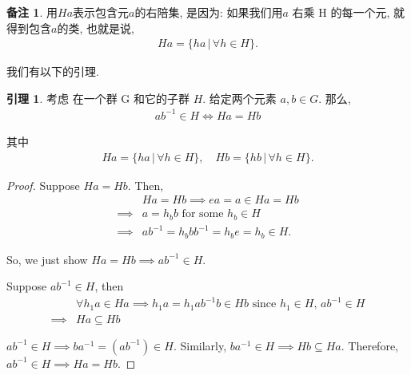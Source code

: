 \documentclass[utf8]{ctexbook}
\theoremstyle{definition}
\newtheorem{memo}{备注}[section]
\newtheorem{lemma}{引理}[section]
\begin{document}
\begin{memo}
用$Ha$表示包含元$a$的右陪集, 是因为: 如果我们用$a$ 右乘 H 的每一个元, 就得到包含$a$的类, 也就是说, 
\begin{align*}
Ha= \{ ha \, | \, \forall h \in H \} .
\end{align*}

我们有以下的引理.

\end{memo}

\begin{lemma}\label{lemma_right_coset_def_equivalence}
考虑 在一个群 G 和它的子群 $H$. 给定两个元素 $a, b \in G$. 那么,
\begin{align*}
 ab^{-1} \in H \iff Ha = Hb 
\end{align*}

其中
\begin{align*}
Ha= \{ ha \, | \, \forall h \in H \} , \quad Hb= \{ hb \, | \, \forall h \in H \} .
\end{align*}

\end{lemma}

\begin{proof}
Suppose $Ha = Hb$. Then,
\begin{align*}
& Ha = Hb \implies ea = a \in Ha = Hb \\
\implies & a = h_b b \mbox{ for some } h_b \in H \\
\implies & a b^{-1} = h_b b b^{-1} = h_b e = h_b \in H .
\end{align*}

So, we just show $Ha = Hb \implies ab^{-1} \in H$.

Suppose $ab^{-1} \in H$, then
\begin{align*}
& \forall h_1 a \in Ha \implies h_1 a = h_1 a b^{-1} b \in Hb \mbox{ since } h_1 \in H, \,  a b^{-1} \in H \\
\implies & Ha \subseteq Hb
\end{align*}

$ab^{-1} \in H \implies b a^{-1} =  (ab^{-1}) \in H$. Similarly, $b a^{-1} \in H \implies Hb \subseteq Ha$. Therefore, $ab^{-1} \in H \implies Ha = Hb$.



\end{proof}
\end{document}
